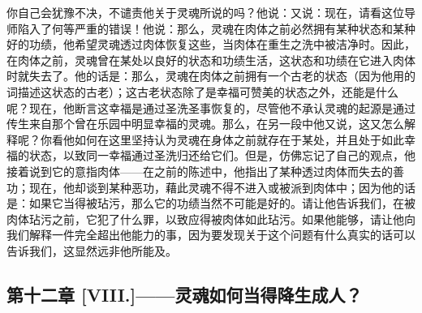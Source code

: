 你自己会犹豫不决，不谴责他关于灵魂所说的吗？他说：又说：现在，请看这位导师陷入了何等严重的错误！他说：那么，灵魂在肉体之前必然拥有某种状态和某种好的功绩，他希望灵魂透过肉体恢复这些，当肉体在重生之洗中被洁净时。因此，在肉体之前，灵魂曾在某处以良好的状态和功绩生活，这状态和功绩在它进入肉体时就失去了。他的话是：那么，灵魂在肉体之前拥有一个古老的状态（因为他用的词描述这状态的古老）；这古老状态除了是幸福可赞美的状态之外，还能是什么呢？现在，他断言这幸福是通过圣洗圣事恢复的，尽管他不承认灵魂的起源是通过传生来自那个曾在乐园中明显幸福的灵魂。那么，在另一段中他又说，这又怎么解释呢？你看他如何在这里坚持认为灵魂在身体之前就存在于某处，并且处于如此幸福的状态，以致同一幸福通过圣洗归还给它们。但是，仿佛忘记了自己的观点，他接着说到它的意指肉体——在之前的陈述中，他指出了某种透过肉体而失去的善功；现在，他却谈到某种恶功，藉此灵魂不得不进入或被派到肉体中；因为他的话是：如果它当得被玷污，那么它的功绩当然不可能是好的。请让他告诉我们，在被肉体玷污之前，它犯了什么罪，以致应得被肉体如此玷污。如果他能够，请让他向我们解释一件完全超出他能力的事，因为要发现关于这个问题有什么真实的话可以告诉我们，这显然远非他所能及。\par


\subsection{第十二章 [VIII.]——灵魂如何当得降生成人？}


